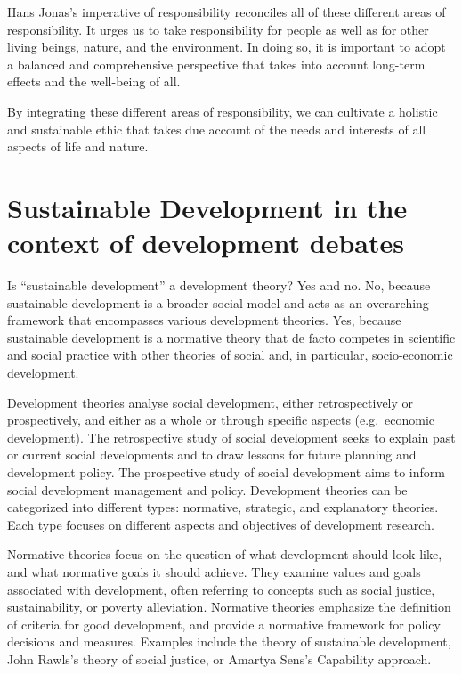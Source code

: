 \documentclass[
  a4paper,
  openany]{book}
\begin{document}
Hans Jonas's imperative of responsibility reconciles all of these
different areas of responsibility. It urges us to take responsibility
for people as well as for other living beings, nature, and the
environment. In doing so, it is important to adopt a balanced and
comprehensive perspective that takes into account long-term effects and
the well-being of all.

By integrating these different areas of responsibility, we can cultivate
a holistic and sustainable ethic that takes due account of the needs and
interests of all aspects of life and nature.

\section{Sustainable Development in the context of development
debates}\label{sustainable-development-in-the-context-of-development-debates}

Is ``sustainable development'' a development theory? Yes and no. No,
because sustainable development is a broader social model and acts as an
overarching framework that encompasses various development theories.
Yes, because sustainable development is a normative theory that de facto
competes in scientific and social practice with other theories of social
and, in particular, socio-economic development.

Development theories analyse social development, either retrospectively
or prospectively, and either as a whole or through specific aspects
(e.g.~economic development). The retrospective study of social
development seeks to explain past or current social developments and to
draw lessons for future planning and development policy. The prospective
study of social development aims to inform social development management
and policy. Development theories can be categorized into different
types: normative, strategic, and explanatory theories. Each type focuses
on different aspects and objectives of development research.

Normative theories focus on the question of what development should look
like, and what normative goals it should achieve. They examine values
and goals associated with development, often referring to concepts such
as social justice, sustainability, or poverty alleviation. Normative
theories emphasize the definition of criteria for good development, and
provide a normative framework for policy decisions and measures.
Examples include the theory of sustainable development, John Rawls's
theory of social justice, or Amartya Sens's Capability approach.
\end{document}
